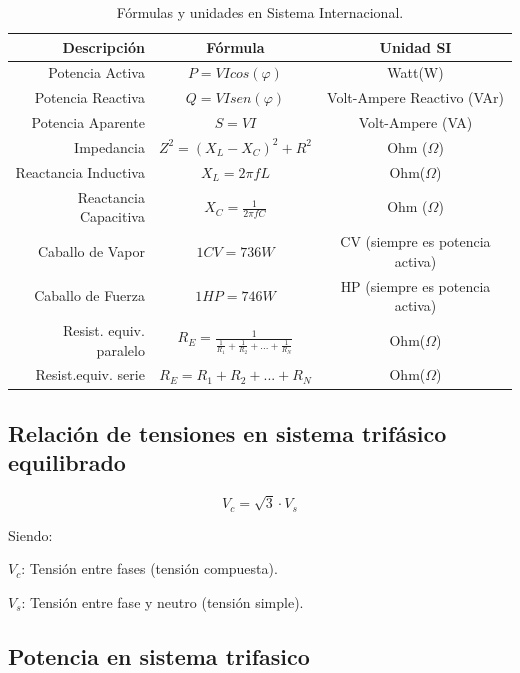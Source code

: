 \documentclass[../main]{subfiles}
\begin{document}
\begin{center}
  \begin{table}[h]
    \centering
    \begin{tabular}{|r|c|c|}\hline
      Descripción & Fórmula & Unidad SI\\\hline
      Potencia Activa & $P=V I cos(\varphi)$ & Watt(W)\\
      Potencia Reactiva & $Q=V I sen(\varphi)$ & Volt-Ampere Reactivo (VAr)\\
      Potencia Aparente & $S=V I$ & Volt-Ampere (VA)\\ \hline
      Impedancia &$Z^2=(X_L-X_C)^2+R^2$ & Ohm ($\Omega$)\\
      Reactancia Inductiva & $X_L=2 \pi f L$ & Ohm($\Omega$)\\
      Reactancia Capacitiva & $X_C=\frac{1}{2 \pi f C} $ & Ohm
      ($\Omega$)\\\hline
      Caballo de Vapor & $1CV = 736W$& CV (siempre es potencia activa) \\
      Caballo de Fuerza & $1HP = 746W$& HP (siempre es potencia
      activa) \\ \hline
      Resist. equiv. paralelo & $R_E =
      \frac{1}{\frac{1}{R_1}+\frac{1}{R_2}+...+\frac{1}{R_N}}$&
      Ohm($\Omega$) \\
      Resist.equiv. serie & $R_E = R_1+R_2+...+R_N$&
      Ohm($\Omega$) \\ \hline

    \end{tabular}
    \caption{Fórmulas y unidades en Sistema Internacional.}
  \end{table}
\end{center}
\subsection{ Relación de tensiones en sistema trifásico equilibrado}
\begin{equation}
  V_c= \sqrt{3} \cdot V_s
\end{equation}

Siendo:

$V_c$: Tensión entre fases (tensión compuesta).

$V_s$: Tensión entre fase y neutro (tensión simple).

\subsection{Potencia en sistema trifasico}
\end{document}

